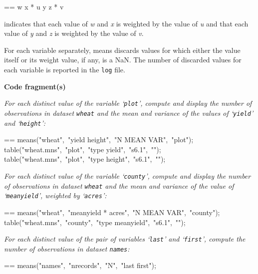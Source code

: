 \documentclass{book}
\makeatletter
\newcommand\Texinfocommandstyletextvar[1]{{\normalfont{}\textsl{#1}}}%
\newenvironment{Texinfopreformatted}{%
  \par\GNUTobeylines\obeyspaces\frenchspacing\parskip=\z@\parindent=\z@}{}
{\catcode`\^^M=13 \gdef\GNUTobeylines{\catcode`\^^M=13 \def^^M{\null\par}}}
\newenvironment{Texinfoindented}{\begin{list}{}{}\item\relax}{\end{list}}
\renewcommand{\_}{\Texinfounderscore\discretionary{}{}{}}
\makeatother
\begin{document}
\begin{Texinfoindented}
\begin{Texinfopreformatted}%
\ttfamily w x * u y z * v
\end{Texinfopreformatted}
\end{Texinfoindented}

\noindent{}indicates that each value of \Texinfocommandstyletextvar{w} and \Texinfocommandstyletextvar{x}
is weighted by the value of \Texinfocommandstyletextvar{u} and that each value of
\Texinfocommandstyletextvar{y} and \Texinfocommandstyletextvar{z} is weighted by the value of
\Texinfocommandstyletextvar{v}.

For each variable separately,
means discards values for which either the value itself or
its weight value, if any, is a NaN.
%
The number of discarded values for each variable is reported
in the \texttt{log} file.

\noindent{}\textbf{Code fragment(s)}

\emph{For each distinct value of the variable `\texttt{plot}',
compute and display the number of observations in dataset \texttt{wheat}
and the mean and variance of the values of `\texttt{yield}' and
`\texttt{height}':}
\begin{Texinfoindented}
\begin{Texinfopreformatted}%
\ttfamily means("wheat",\ "yield height",\ "N MEAN VAR",\ "plot");
table("wheat.mns",\ "plot",\ "\_type\_ yield",\ "s6.1",\ "");
table("wheat.mns",\ "plot",\ "\_type\_ height",\ "s6.1",\ "");
\end{Texinfopreformatted}
\end{Texinfoindented}

\emph{For each distinct value of the variable `\texttt{county}',
compute and display the number of observations in dataset \texttt{wheat}
and the mean and variance of the value of `\texttt{meanyield}',
weighted by `\texttt{acres}':}
\begin{Texinfoindented}
\begin{Texinfopreformatted}%
\ttfamily means("wheat",\ "meanyield * acres",\ "N MEAN VAR",\ "county");
table("wheat.mns",\ "county",\ "\_type\_ meanyield",\ "s6.1",\ "");
\end{Texinfopreformatted}
\end{Texinfoindented}

\emph{For each distinct value of the pair of variables `\texttt{last}'
and `\texttt{first}', compute the number of observations in dataset \texttt{names}:}
\begin{Texinfoindented}
\begin{Texinfopreformatted}%
\ttfamily means("names",\ "nrecords",\ "N",\ "last first");
\end{Texinfopreformatted}
\end{Texinfoindented}
\end{document}
